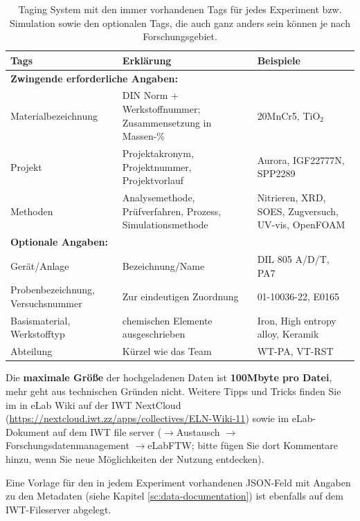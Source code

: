 \begin{table}[H]
 \centering
 \begin{tabular}{|p{5cm}|p{7cm}|p{3cm}|}
 \hline
 {\bf Tags} & {\bf Erklärung} & {\bf Beispiele} \\
 \hline
 \multicolumn{3}{|l|}{\bf Zwingende erforderliche Angaben:} \\
 \hline
 Materialbezeichnung & DIN Norm + Werkstoffnummer; Zusammensetzung in Massen-\%  & 20MnCr5, TiO$_2$ \\ \hdashline
 Projekt & Projektakronym, Projektnummer, Projektvorlauf & Aurora, IGF22777N, SPP2289 \\ \hdashline
 Methoden & Analysemethode, Prüfverfahren, Prozess, Simulationsmethode & Nitrieren, XRD, SOES, Zugversuch, UV-vis, OpenFOAM \\
 \hline
 \multicolumn{3}{|l|}{\bf Optionale Angaben:} \\
 \hline
 Gerät/Anlage & Bezeichnung/Name & DIL 805 A/D/T, PA7 \\ \hdashline
 Probenbezeichnung, Versuchsnummer & Zur eindeutigen Zuordnung & 01-10036-22, E0165 \\ \hdashline
 Basismaterial, Werkstofftyp & chemischen Elemente ausgeschrieben & Iron, High entropy alloy, Keramik \\ \hdashline
 Abteilung & Kürzel wie das Team & WT-PA, VT-RST \\
 \hline
 \end{tabular}
 \caption{Taging System mit den immer vorhandenen Tags für jedes Experiment bzw. Simulation sowie den optionalen Tags, die auch ganz anders sein können je nach Forschungsgebiet.}
\label{table:tagging-system}
\end{table}





Die \textbf{maximale Größe} der hochgeladenen Daten ist \textbf{100Mbyte pro Datei}, mehr geht aus technischen Gründen nicht. Weitere Tipps und Tricks finden Sie im in eLab Wiki auf der IWT NextCloud (\url{https://nextcloud.iwt.zz/apps/collectives/ELN-Wiki-11}) sowie im eLab-\linebreak Dokument auf dem IWT file server ($\rightarrow$Austausch $\rightarrow$Forschungsdatenmanagement $\rightarrow$eLabFTW; bitte fügen Sie dort Kommentare hinzu, wenn Sie neue Möglichkeiten der Nutzung entdecken).

Eine Vorlage für den in jedem Experiment vorhandenen JSON-Feld mit Angaben zu den Metadaten (siehe Kapitel \ref{sc:data-documentation}) ist ebenfalls auf dem IWT-Fileserver abgelegt.
